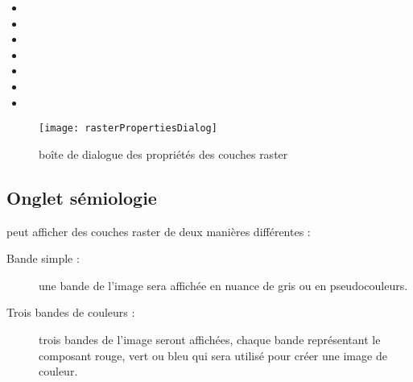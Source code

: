 \begin{itemize}[label=--]
 \item {}
 \item {}
 \item {}
 \item {}
 \item {}
 \item {}
 \item {}
\end{itemize}

\begin{figure}[htb]
  \begin{center}
   
   \texttt{[image: rasterPropertiesDialog]}
   \caption{boîte de dialogue des propriétés des couches raster
\nixcaption}\label{fig:raster_properties}
\end{center}
\end{figure}

\subsection{Onglet sémiologie}\label{label_sombology}

\qg peut afficher des couches raster de deux manières différentes
:

\begin{description}
\item[Bande simple :] une bande de l'image sera affichée en nuance de gris ou en pseudocouleurs.
\item[Trois bandes de couleurs :] trois bandes de l'image seront affichées,
chaque bande représentant le composant rouge, vert ou bleu qui sera utilisé pour créer une image de couleur.
\end{description}


